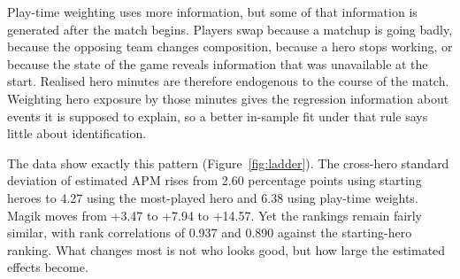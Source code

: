 \documentclass[11pt]{article}
\begin{document}
Play-time weighting uses more information, but some of that information is generated after the
match begins. Players swap because a matchup is going badly, because the opposing team changes
composition, because a hero stops working, or because the state of the game reveals information
that was unavailable at the start. Realised hero minutes are therefore endogenous to the course
of the match. Weighting hero exposure by those minutes gives the regression information about
events it is supposed to explain, so a better in-sample fit under that rule says little about
identification.

The data show exactly this pattern (Figure~\ref{fig:ladder}). The cross-hero standard deviation
of estimated APM rises from 2.60 percentage points using starting heroes to 4.27 using
the most-played hero and 6.38 using play-time weights. Magik moves from +3.47 to
+7.94 to +14.57. Yet the rankings remain fairly similar, with rank correlations of 0.937
and 0.890 against the starting-hero ranking. What changes most is not who looks good, but
how large the estimated effects become.
\end{document}
